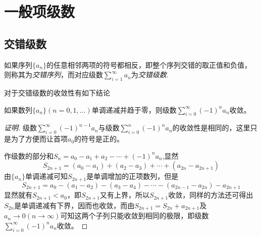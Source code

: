 
\section{一般项级数}
\label{sec:signed-series}

\subsection{交错级数}
\label{sec:alternating-sign-series}

\begin{definition}
  如果序列$\{a_n\}$的任意相邻两项的符号都相反，即整个序列交错的取正值和负值，则称其为\emph{交错序列}，而对应级数$\sum_{i=1}^{\infty}a_n$为\emph{交错级数}.
\end{definition}

对于交错级数的收敛性有如下结论

\begin{theorem}
  如果数列$\{a_n\}(n=0,1,\ldots)$单调递减并趋于零，则级数$\sum_{i=0}^{\infty}(-1)^{n}a_n$收敛。
\end{theorem}

\begin{proof}[证明]
级数$\sum_{i=0}^{\infty}(-1)^{n-1}a_n$与级数$\sum_{i=0}^n(-1)^na_n$的收敛性是相同的，这里只是为了方便而让首项$a_0$的符号是正的。  

作级数的部分和$S_n=a_0-a_1+a_2-\cdots+(-1)^na_n$,显然
\[ S_{2n+1}=(a_0-a_1)+(a_2-a_3)+\cdots+(a_{2n}-a_{2n+1}) \]
由$\{a_n\}$单调递减可知$S_{2n+1}$是单调增加的正项数列，但是
\[ S_{2n+1}=a_0-(a_1-a_2)-(a_3-a_4)-\cdots-(a_{2n-1}-a_{2n})-a_{2n+1} \]
显然就有$S_{2n+1}<a_0$，即$S_{2n+1}$又有上界，所以$S_{2n+1}$收敛，同样的方法还可得出$S_{2n}$是单调递减有下界，因而也收敛，而由$S_{2n+1}=S_{2n}+a_{2n+1}$及$a_n \to 0(n \to \infty)$可知这两个子列只能收敛到相同的极限，即级数$\sum_{i=0}^{\infty}(-1)^na_n$收敛。
\end{proof}

